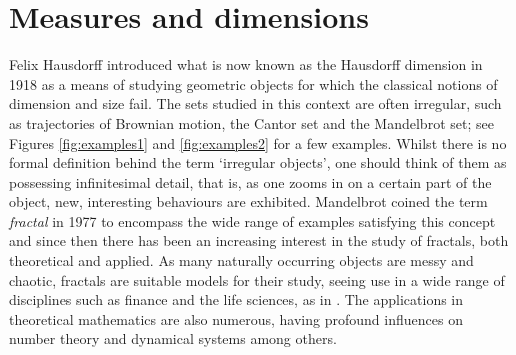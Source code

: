 \chapter{Measures and dimensions}
\label{chap:intro}



Felix Hausdorff introduced what is now known as the Hausdorff dimension in 1918 \cite{hausdorff} as a means of studying geometric objects for which the classical notions of dimension and size fail. The sets studied in this context are often irregular, such as trajectories of Brownian motion, the Cantor set and the Mandelbrot set; see Figures \ref{fig:examples1} and \ref{fig:examples2} for a few examples. Whilst there is no formal definition behind the term `irregular objects', one should think of them as possessing infinitesimal detail, that is, as one zooms in on a certain part of the object, new, interesting behaviours are exhibited. Mandelbrot \cite{mandelbrot} coined the term \textit{fractal} in 1977 to encompass the wide range of examples satisfying this concept and since then there has been an increasing interest in the study of fractals, both theoretical and applied. As many naturally occurring objects are messy and chaotic, fractals are suitable models for their study, seeing use in a wide range of disciplines such as finance and the life sciences, as in \cite{diieva, diieva2}. The applications in theoretical mathematics are also numerous, having profound influences on number theory and dynamical systems among others. 



